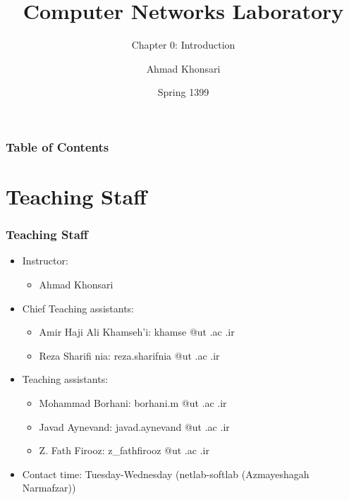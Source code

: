 \documentclass[aspectratio=169,15pt]{beamer}
\title{Computer Networks Laboratory}
\subtitle{Chapter 0: Introduction}
\author{Ahmad Khonsari}
\institute[ECE @ UT]{
    Electrical and Computer Engineering Department\\
    Tehran University \newline
    \url{http://ece.ut.ac.ir/portal/}
}
\date{Spring 1399}
\begin{document}
\frame{\titlepage}


\begin{frame}
    \frametitle{Table of Contents}
    \tableofcontents
\end{frame}

\section{Teaching Staff}
\begin{frame}
\frametitle{Teaching Staff}
\begin{itemize}
    \item Instructor:
    \begin{itemize}
        \item Ahmad Khonsari
    \end{itemize}
    \item Chief Teaching assistants:
    \begin{itemize}
        \item Amir Haji Ali Khamseh’i: \alert{khamse @ut .ac .ir}
        \item Reza Sharifi nia: \alert{reza.sharifnia @ut .ac .ir}
    \end{itemize}
    \item Teaching assistants:
    \begin{itemize}
        \item Mohammad Borhani: \alert{borhani.m @ut .ac .ir}
        \item Javad Aynevand: \alert{javad.aynevand @ut .ac .ir}
        \item Z. Fath Firooz: \alert{z\_fathfirooz @ut .ac .ir}
    \end{itemize}
    \item Contact time: Tuesday-Wednesday (netlab-softlab (Azmayeshagah Narmafzar))
\end{itemize}

\end{frame}
\end{document}
